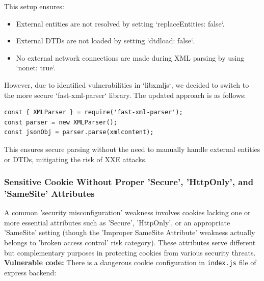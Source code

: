 \documentclass[]{article}
\begin{document}
This setup ensures:
\begin{itemize}
    \item External entities are not resolved by setting `replaceEntities: false`.
    \item External DTDs are not loaded by setting `dtdload: false`.
    \item No external network connections are made during XML parsing by using `nonet: true`.
\end{itemize}

However, due to identified vulnerabilities in `libxmljs`, we decided to switch to the more secure `fast-xml-parser` library. The updated approach is as follows:

\begin{lstlisting}
const { XMLParser } = require('fast-xml-parser');
const parser = new XMLParser();
const jsonObj = parser.parse(xmlcontent);
\end{lstlisting}

This ensures secure parsing without the need to manually handle external entities or DTDs, mitigating the risk of XXE attacks.

\subsubsection{Sensitive Cookie Without Proper 'Secure', 'HttpOnly', and 'SameSite' Attributes}
\label{subsubsec:sensitive_cookie_without_secure_and_httponly_attributes}

A common 'security misconfiguration' weakness involves cookies lacking one or more essential attributes such as 'Secure', 'HttpOnly', or an appropriate 'SameSite' setting (though the 'Improper SameSite Attribute' weakness actually belongs to 'broken access control' risk category). These attributes serve different but complementary purposes in protecting cookies from various security threats. \\ 
\textbf{Vulnerable code:}
There is a dangerous cookie configuration in \texttt{index.js} file of express backend:
\end{document}
